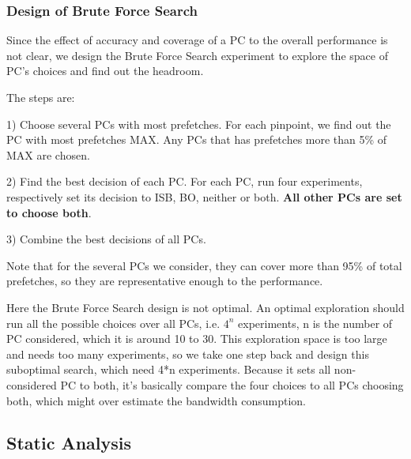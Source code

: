     \subsubsection{Design of Brute Force Search}
  \label{sec:designBFS}
  Since the effect of accuracy and coverage of a PC to the overall performance is not clear, we design the Brute Force Search experiment to explore the space of PC's choices and find out the headroom. \par
  The steps are: \par
  1) Choose several PCs with most prefetches. For each pinpoint, we find out the PC with most prefetches MAX. Any PCs that has prefetches more than 5\% of MAX are chosen.\par 
  2) Find the best decision of each PC. For each PC, run four experiments, respectively set its decision to ISB, BO, neither or both. \textbf{All other PCs are set to choose both}.\par
  3) Combine the best decisions of all PCs.\par
  Note that for the several PCs we consider, they can cover more than 95\% of total prefetches, so they are representative enough to the performance. \par
  Here the Brute Force Search design is not optimal. An optimal exploration should run all the possible choices over all PCs, i.e. $4^{n}$ experiments, n is the number of PC considered, which it is around 10 to 30. 
  This exploration space is too large and needs too many experiments, so we take one step back and design this suboptimal search, which need 4*n experiments. Because it sets all non-considered PC to both, it's basically compare the four choices to all PCs choosing both, which might over estimate the bandwidth consumption. \par
  
  
  
  \subsection{Static Analysis}
  \label{sec:staticanalysis}


 
